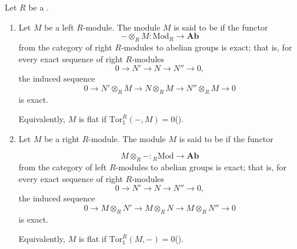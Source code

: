 \begin{definition} \label{definition:flat_left_right_module_over_a_ring}
    Let $R$ be a . 
    \begin{enumerate}
        \item Let $M$ be a left $R$-module. The module $M$ is said to be  if the functor
        \[
        -\otimes_R M : \mathrm{Mod}_R \to \mathbf{Ab}
        \]
         from the category of right $R$-modules to abelian groups is exact; that is, for every exact sequence of right $R$-modules
        \[
        0 \to N' \to N \to N'' \to 0,
        \]
        the induced sequence
        \[
        0 \to N' \otimes_R M \to N \otimes_R M \to N'' \otimes_R M \to 0
        \]
        is exact.


        Equivalently, $M$ is flat if $\mathrm{Tor}_1^R(-,M) = 0$().

        \item Let $M$ be a right $R$-module. The module $M$ is said to be  if the functor

        \[
        M \otimes_R - : {}_R \mathrm{Mod} \to \mathbf{Ab}
        \]
        from the category of left $R$-modules to abelian groups is exact; that is, for every exact sequence of right $R$-modules
        \[
        0 \to N' \to N \to N'' \to 0,
        \]
        the induced sequence
        \[
        0 \to M \otimes_R N'  \to M \otimes_R N \to M \otimes_R N'' \to 0
        \]
        is exact.

        Equivalently, $M$ is flat if $\mathrm{Tor}_1^R(M,-) = 0$().

    \end{enumerate}
\end{definition}
